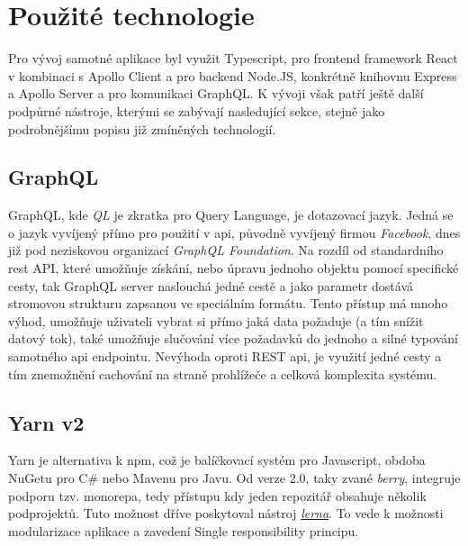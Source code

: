 \section{Použité technologie}
\label{sc:used_techologies}

Pro vývoj samotné aplikace byl využit Typescript, pro frontend framework React v kombinaci s Apollo Client a pro backend Node.JS, konkrétně knihovnu Express a Apollo Server a pro komunikaci GraphQL. K vývoji však patří ještě další podpůrné nástroje, kterými se zabývají nasledující sekce, stejně jako podrobnějšímu popisu již zmíněných technologií.

\subsection{GraphQL}
\label{ss:graphql}
GraphQL, kde \emph{QL} je zkratka pro Query Language, je dotazovací jazyk. Jedná se o jazyk vyvíjený přímo pro použití v \acrshort{api}, původně vyvíjený firmou \emph{Facebook}, dnes již pod neziskovou organizací \emph{GraphQL Foundation}. Na rozdíl od standardního \acrshort{rest} API, které umožňuje získání, nebo úpravu jednoho objektu pomocí specifické cesty, tak GraphQL server naslouchá jedné cestě a jako parametr dostává stromovou strukturu zapsanou ve speciálním formátu. Tento přístup má mnoho výhod, umožňuje uživateli vybrat si přímo jaká data požaduje (a tím snížit datový tok), také umožňuje slučování více požadavků do jednoho a silné typování samotného \acrshort{api} endpointu. Nevýhoda oproti REST \acrshort{api}, je využití jedné cesty a tím znemožnění cachování na straně prohlížeče a celková komplexita systému.

\subsection{Yarn v2}
\label{ss:yarn}
Yarn je alternativa k \acrshort{npm}, což je balíčkovací systém pro Javascript, obdoba NuGetu pro C\# nebo Mavenu pro Javu. Od verze 2.0, taky zvané \emph{berry}, integruje podporu tzv. monorepa, tedy přístupu kdy jeden repozitář obsahuje několik podprojektů. Tuto možnost dříve poskytoval nástroj \href{https://github.com/lerna/lerna}{\emph{lerna}}. To vede k možnosti modularizace aplikace a zavedení Single responsibility principu.

